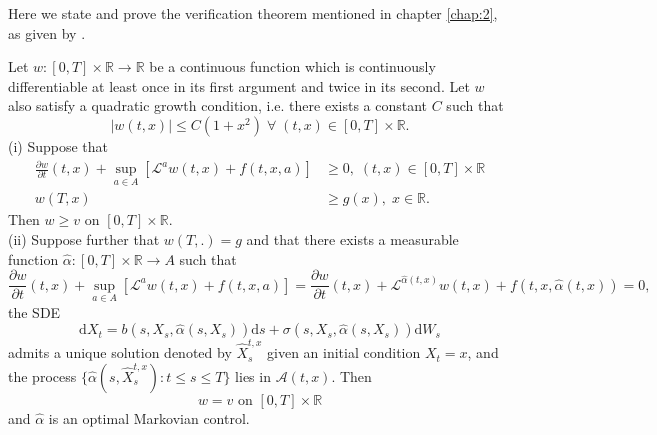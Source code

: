 Here we state and prove the verification theorem mentioned in chapter \ref{chap:2},
as given by \textcite{Pham}.
\begin{theorem}
    Let $w:[0,T]\times\mathbb{R}\rightarrow\mathbb{R}$ be a continuous function which
    is continuously differentiable at least once in its first argument and twice
    in its second. Let $w$ also satisfy a quadratic growth condition, i.e. there
    exists a constant $C$ such that
    \begin{equation*}
        |w(t,x)|\leq C(1+x^2)\;\forall\;(t,x)\in[0,T]\times\mathbb{R}.
    \end{equation*}
    (i) Suppose that
    \begin{align}
        \frac{\partial w}{\partial t}(t,x)+\sup_{a\in A}[\mathcal{L}^aw(t,x)+f(t,x,a)]&\geq0,\;(t,x)\in[0,T]\times\mathbb{R}\label{eq:A.1}\\
        w(T,x)&\geq g(x),\;x\in\mathbb{R}.\label{eq:A.2}
    \end{align}
    Then $w\geq v$ on $[0,T]\times\mathbb{R}.$\\
    (ii) Suppose further that $w(T,.)=g$ and that there exists a measurable function
    $\hat{\alpha}:[0,T]\times\mathbb{R}\rightarrow A$ such that
    \begin{equation*}
        \frac{\partial w}{\partial t}(t,x)+\sup_{a\in A}[\mathcal{L}^aw(t,x)+f(t,x,a)]=\frac{\partial w}{\partial t}(t,x)+\mathcal{L}^{\hat{\alpha}(t,x)}w(t,x)+f(t,x,\hat{\alpha}(t,x))=0,
    \end{equation*}
    the SDE
    \begin{equation*}
        \mathrm dX_t=b(s,X_s,\hat{\alpha}(s,X_s))\mathrm ds+\sigma(s,X_s,\hat{\alpha}(s,X_s))\mathrm dW_s
    \end{equation*}
    admits a unique solution denoted by $\hat{X}_s^{t,x}$ given an initial condition
    $X_t=x$, and the process $\{\hat{\alpha}(s,\hat{X}_s^{t,x}):t\leq s\leq T\}$
    lies in $\mathcal{A}(t,x)$. Then
    \begin{equation}
        w=v\textrm{ on }[0,T]\times\mathbb{R}
    \end{equation}
    and $\hat{\alpha}$ is an optimal Markovian control.
\end{theorem}
